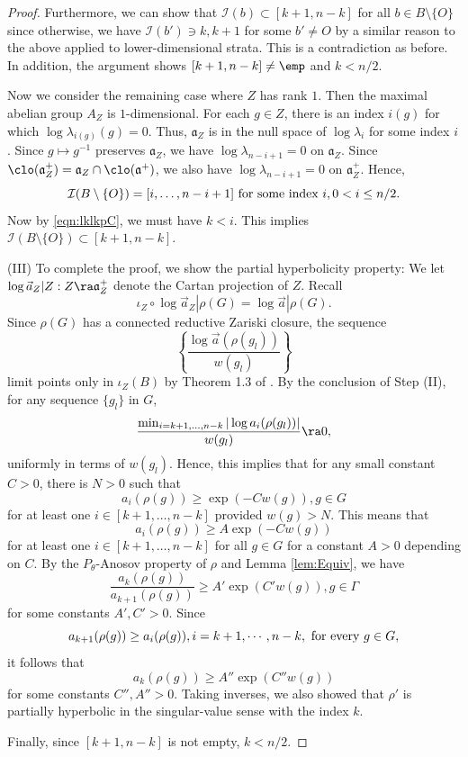 \begin{proof}
Furthermore, we can show that $\mathcal{I}(b) \subset [k+1, n-k]$ for all $b \in B \setminus \{O\}$ since otherwise, 
we have $\mathcal{I}(b') \ni k, k+1$ for some $b'\ne O$ by a similar reason to the above applied to lower-dimensional strata. 
This is a contradiction as before. 
In addition, the argument shows $[k+1, n-k] \ne \emp$ and $k < n/2$. 


	 Now we consider the remaining case where $Z$ has rank $1$. 
Then the maximal abelian group $A_Z$ is $1$-dimensional. 
For each $g \in Z$, there is an 
index $i(g)$ for which $\log\lambda_{i(g)}(g) =0$. 
Thus, $\mathfrak{a}_Z$ is in the null space of $\log \lambda_i$ for some index $i$. 
Since $g \mapsto g^{-1}$ preserves $\mathfrak{a}_Z$, 
we have $\log \lambda_{n-i+1} = 0$ on $\mathfrak{a}_Z$. 
Since $\clo(\mathfrak{a}_Z^+) = \mathfrak{a}_Z \cap \clo(\mathfrak{a}^+)$, we also have 
$\log \lambda_{n-i+1}=0$ on $\mathfrak{a}_Z^+$. 
Hence, 
\[\mathcal{I}(B\setminus \{O\}) = [i, \dots, n-i+1] \hbox{ for some index } i, 0< i \leq n/2.\] 
Now by \eqref{eqn:lklkpC}, we must have $k < i$. This 
implies $\mathcal{I}(B \setminus \{O\}) \subset [k+1, n-k]$. 







	
	(III) To complete the proof, we show the 
	partial hyperbolicity property: 
We let $\log \vec{a}_Z|Z: Z \ra \mathfrak{a}_Z^+$ denote the Cartan projection of $Z$. 
Recall 
\[\iota_Z\circ \log \vec{a}_Z| \rho(G) 
= \log \vec{a}|\rho(G).\] 
Since $\rho(G)$ has a connected reductive Zariski closure, 
the sequence 
\[\left\{\frac{\log \vec{a}(\rho(g_l))}{w(g_l)}\right\}\]
 limit points only in $\iota_Z(B)$
by Theorem 1.3 of \cite{BS2021}. 
By  the conclusion of Step (II), %
for any sequence $\{g_l\}$ in  $G$, 
\[
\frac{\min_{i=k+1,\dots,n-k} |\log a_i(\rho(g_l))|}{w(g_l)} \ra 0,
\]
uniformly in terms of $w(g_l)$. 
Hence, this implies that for any small constant $C> 0$, there is $N> 0$ such that 
\[a_i(\rho(g)) \geq \exp(-C w(g)), g \in G\] for at least one $i \in [k+1, \dots, n-k]$ 
provided $w(g) > N$.
This means that 
\[a_i(\rho(g)) \geq A \exp(-C w(g))\] for at least one $i \in [k+1, \dots, n-k]$ for all $g\in G$ 
for a constant $A > 0$ depending on $C$. 
By the $P_\theta$-Anosov property of $\rho$ and Lemma \ref{lem:Equiv}, we have 
\[\frac{a_k(\rho(g))}{a_{k+1}(\rho(g))}\geq A'\exp(C'w(g)), g \in \Gamma\] 
for some constants $A', C'> 0$. 
Since 
\[a_{k+1}(\rho(g)) \geq a_i(\rho(g)), i=k+1, \cdots, n-k, 
\hbox{ for every } g \in G,\] 
it follows that 
\[a_k(\rho(g)) \geq A'' \exp(C'' w(g))\] for some constants $C'', A''> 0$. 
Taking inverses, we also showed that $\rho'$ is partially hyperbolic 
in the singular-value sense with the index $k$. 

Finally, since $[k+1, n-k]$ is not empty, $k < n/2$.  
	\end{proof} 


